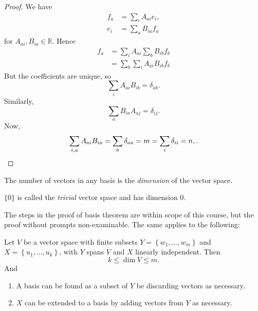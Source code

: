 \documentclass[10pt]{article}
\def\le{\leqslant}
\begin{document}
    \begin{proof}
        We have 
        \[
            \begin{aligned}
                 f_a&= \sum_{i}A_{ai}e_i,\\ 
                 e_i&= \sum_{a}B_{ia}f_a
            \end{aligned}
        \]
        for $ A_{ai},B_{ia}\in \mathbb{R} $.
        Hence
        \[
            \begin{aligned}
                f_a&=\sum_{i}A_{ai}\sum_{b}B_{ib}f_{b}\\
                &= \sum_{b}\sum_{i}A_{ai}B_{ib}f_b
            \end{aligned}
        \]
        But the coefficients are unique, so 
        \[
            \sum_{i}A_{ai}B_{ib}=\delta_{ab}
        .\]
        Similarly,
        \[
            \sum_{a}B_{ia}A_{aj}=\delta_{ij}
        .\]
        Now, 
        \[
            \sum_{i,a}A_{ai}B_{ia}=\sum_{a} \delta_{aa}=m = \sum_{i}\delta_{ii}=n,\\
        .\]
    \end{proof}
    \begin{definition}
        The number of vectors in any basis is the \textit{dimension} of the vector space.
    \end{definition}
    \begin{remark}
        $\{0\}$ is called the \textit{trivial} vector space and has dimension 0.

        The steps in the proof of basis theorem are within scope of this course, but the proof without prompts non-examinable. The same applies to the following:
    \end{remark}
    \begin{proposition}\label{prop:reduce_span}
        Let $V$ be a vector space with finite subsets $ Y=\left\{ w_1,\dots,w_m\right\}$ and $ X=\left\{ u_1,\dots,u_k\right\} $, with $Y$ spans $V$ and $X$ linearly independent. Then 
        \[
            k\le \dim V\le m
        .\]
        And 
        \begin{enumerate}[(1)]
            \item A basis can be found as a subset of $Y$ be discarding vectors as necessary.
            \item $X$ can be extended to a basis by adding vectors from $Y$ as necessary.
        \end{enumerate}
    \end{proposition}
\end{document}
